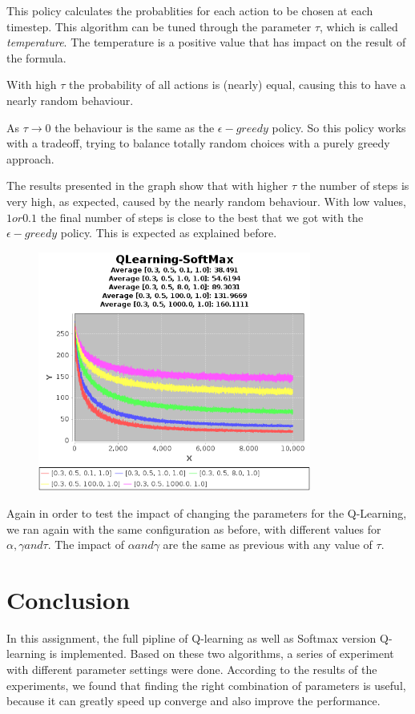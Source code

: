 \documentclass{article}
\begin{document}
This policy calculates the probablities for each action to be chosen at each
timestep. This algorithm can be tuned through the parameter $\tau$, which is
called \emph{temperature}.
The temperature is a positive value that has impact on the result of the
formula.

With high $\tau$ the probability of all actions is (nearly) equal, causing
this to have a nearly random behaviour.

As $\tau \rightarrow 0$ the behaviour is the same as the $\epsilon-greedy$
policy.
So this policy works with a tradeoff, trying to balance totally random choices with a purely greedy approach.

The results presented in the graph show that with higher $\tau$ the number of
steps is very high, as expected, caused by the nearly random behaviour. With low
values, $1 or 0.1$ the final number of steps is close to the best that we got
with the $\epsilon-greedy$ policy. This is expected as explained before.

\begin{figure}[htbp]
\centering
\includegraphics[width=0.8\textwidth]{res/alpha_03_gamma_05_temp_01_to_1000_IV_1.png}
\end{figure}

Again in order to test the impact of changing the parameters for the Q-Learning,
we ran again with the same configuration as before, with different values for
$\alpha, \gamma and \tau$. 
The impact of  $\alpha and \gamma$ are the same as previous with any value of
$\tau$.

\section{Conclusion}

In this assignment, the full pipline of Q-learning as well as Softmax version Q-learning is implemented. Based on these two algorithms, a series of experiment with different parameter settings were done. According to the results of the experiments, we found that finding the right combination of parameters is useful, because it can greatly speed up converge and also improve the performance.
\end{document}
